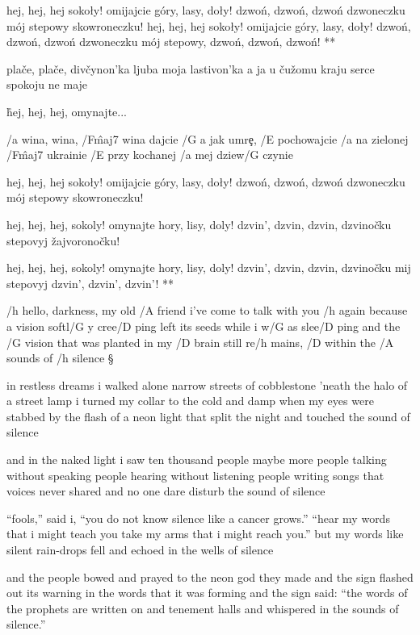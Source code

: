 \R  hej, hej, hej sokoły!
    omijajcie góry, lasy, doły!
    dzwo\' n, dzwo\' n, dzwo\' n dzwoneczku
    mój stepowy skowroneczku! \s
    hej, hej, hej sokoły!
    omijajcie góry, lasy, doły!
    dzwo\' n, dzwo\' n, dzwo\' n dzwoneczku
    mój stepowy, dzwo\' n, dzwo\' n, dzwo\' n! **

plače, plače, divčynon'ka
ljuba moja lastivon'ka
a ja u čužomu kraju
serce spokoju ne maje

\r hej, hej, hej, omynajte...

/a wina, wina, /F\^{maj7} wina dajcie
/G a jak umr\c e, /E pochowajcie
/a na zielonej /F\^{maj7} ukrainie
/E przy kochanej /a mej dziew/G czynie

\R  hej, hej, hej sokoły!
    omijajcie góry, lasy, doły!
    dzwo\' n, dzwo\' n, dzwo\' n dzwoneczku
    mój stepowy skowroneczku! \s

    hej, hej, hej, sokoly!
    omynajte hory, lisy, doly!
    dzvin', dzvin, dzvin, dzvinočku
    stepovyj žajvoronočku! \s

    hej, hej, hej, sokoly!
    omynajte hory, lisy, doly!
    dzvin', dzvin, dzvin, dzvinočku
    mij stepovyj dzvin', dzvin', dzvin'! **




/h hello, darkness, my old /A friend
i've come to talk with you /h again
because a vision softl/G y cree/D ping
left its seeds while i w/G as slee/D ping
and the /G vision that was planted in my /D brain
still re/h mains, /D within the /A sounds of /h silence \S

in restless dreams i walked alone
narrow streets of cobblestone
'neath the halo of a street lamp
i turned my collar to the cold and damp
when my eyes were stabbed by the flash of a neon light
that split the night and touched the sound of silence \s

and in the naked light i saw
ten thousand people maybe more
people talking without speaking
people hearing without listening
people writing songs that voices never shared
and no one dare disturb the sound of silence \s

``fools,'' said i, ``you do not know
silence like a cancer grows.''
``hear my words that i might teach you
take my arms that i might reach you.''
but my words like silent rain-drops fell
and echoed in the wells of silence \s

and the people bowed and prayed
to the neon god they made
and the sign flashed out its warning
in the words that it was forming
and the sign said: ``the words of the prophets are written on 
and tenement halls
and whispered in the sounds of silence.''




